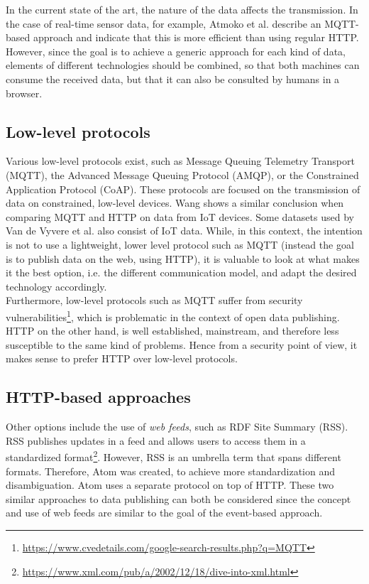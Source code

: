 \noindent In the current state of the art, the nature of the data affects the transmission. In the case of real-time sensor data, for example, Atmoko et al. \cite{atmoko2017} describe an MQTT-based approach and indicate that this is more efficient than using regular HTTP. However, since the goal is to achieve a generic approach for each kind of data, elements of different technologies should be combined, so that both machines can consume the received data, but that it can also be consulted by humans in a browser.

\subsection{Low-level protocols}
Various low-level protocols exist, such as Message Queuing Telemetry Transport (MQTT), the Advanced Message Queuing Protocol (AMQP), or the Constrained Application Protocol (CoAP). These protocols are focused on the transmission of data on constrained, low-level devices. Wang \cite{iotwang} shows a similar conclusion when comparing MQTT and HTTP on data from IoT devices. Some datasets used by Van de Vyvere et al. \cite{van2020comparing} also consist of IoT data. While, in this context, the intention is not to use a lightweight, lower level protocol such as MQTT (instead the goal is to publish data on the web, using HTTP), it is valuable to look at what makes it the best option, i.e. the different communication model, and adapt the desired technology accordingly.\\

\noindent Furthermore, low-level protocols such as MQTT suffer from security vulnerabilities\footnote{\url{https://www.cvedetails.com/google-search-results.php?q=MQTT}}, which is problematic in the context of open data publishing. HTTP on the other hand, is well established, mainstream, and therefore less susceptible to the same kind of problems. Hence from a security point of view, it makes sense to prefer HTTP over low-level protocols.

\subsection{HTTP-based approaches}
Other options include the use of \emph{web feeds}, such as RDF Site Summary (RSS). RSS publishes updates in a feed and allows users to access them in a standardized format\footnote{\url{https://www.xml.com/pub/a/2002/12/18/dive-into-xml.html}}. However, RSS is an umbrella term that spans different formats. Therefore, Atom \cite{gregorio2005atom,ruby2008rss} was created, to achieve more standardization and disambiguation. Atom uses a separate protocol on top of HTTP. These two similar approaches to data publishing can both be considered since the concept and use of web feeds are similar to the goal of the event-based approach.

